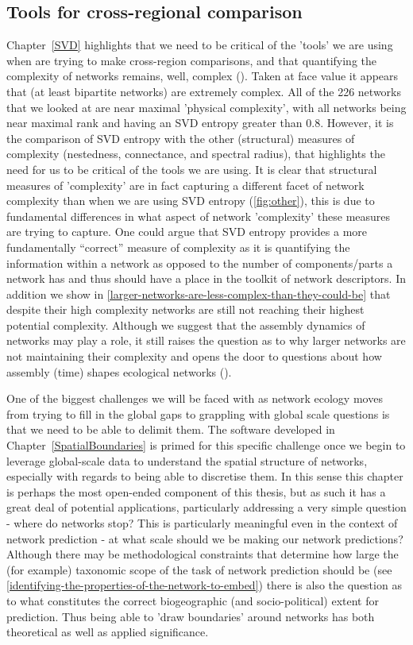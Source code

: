 \begin{refsection}
\subsection{Tools for cross-regional comparison}

Chapter~\ref{SVD} highlights that we need to be critical of the 'tools' we are using when are trying to make cross-region comparisons, and that quantifying the complexity of networks remains, well, complex (\cite{Riva2023Cohesive}). Taken at face value it appears that (at least bipartite networks) are extremely complex. All of the 226 networks that we looked at are near maximal 'physical complexity', with all networks being near maximal rank and having an SVD entropy greater than 0.8. However, it is the comparison of SVD entropy with the other (structural) measures of complexity (nestedness, connectance, and spectral radius), that highlights the need for us to be critical of the tools we are using. It is clear that structural measures of 'complexity' are in fact capturing a different facet of network complexity than when we are using SVD entropy (\autoref{fig:other}), this is due to fundamental differences in what aspect of network 'complexity' these measures are trying to capture. One could argue that SVD entropy provides a more fundamentally “correct” measure of complexity as it is quantifying the information within a network as opposed to the number of components/parts a network has and thus should have a place in the toolkit of network descriptors. In addition we show in \autoref{larger-networks-are-less-complex-than-they-could-be} that despite their high complexity networks are still not reaching their highest potential complexity. Although we suggest that the assembly dynamics of networks may play a role, it still raises the question as to why larger networks are not maintaining their complexity and opens the door to questions about how assembly (time) shapes ecological networks (\cite{Barbier2018GenAss, Saravia2018EcoNet}).

One of the biggest challenges we will be faced with as network ecology moves from trying to fill in the global gaps to grappling with global scale questions is that we need to be able to delimit them. The software developed in Chapter~\ref{SpatialBoundaries} is primed for this specific challenge once we begin to leverage global-scale data to understand the spatial structure of networks, especially with regards to being able to discretise them. In this sense this chapter is perhaps the most open-ended component of this thesis, but as such it has a great deal of potential applications, particularly addressing a very simple question - where do networks stop? This is particularly meaningful even in the context of network prediction - at what scale should we be making our network predictions? Although there may be methodological constraints that determine how large the (for example) taxonomic scope of the task of network prediction should be (see \autoref{identifying-the-properties-of-the-network-to-embed}) there is also the question as to what constitutes the correct biogeographic (and socio-political) extent for prediction. Thus being able to 'draw boundaries' around networks has both theoretical as well as applied significance. 


\end{refsection}

